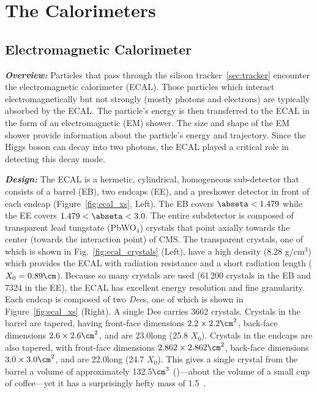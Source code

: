 \section{The Calorimeters}
\label{sec:calo}

\subsection{Electromagnetic Calorimeter}
\label{sec:ecal}

\textit{\textbf{Overview:}}
Particles that pass through the silicon tracker~\ref{sec:tracker} encounter the electromagnetic calorimeter (ECAL).
Those particles which interact electromagnetically but not strongly (\ie mostly photons and electrons) are typically absorbed by the ECAL.
The particle's energy is then transferred to the ECAL in the form of an electromagnetic (EM) shower.
The size and shape of the EM shower provide information about the particle's energy and trajectory.
Since the Higgs boson can decay into two photons, the ECAL played a critical role in detecting this decay mode.

\textit{\textbf{Design:}}
The ECAL is a hermetic, cylindrical, homogeneous sub-detector that consists of a barrel (EB), two endcaps (EE), and a preshower detector in front of each endcap (Figure~\ref{fig:ecal_xs}, Left).
The EB covers $\abseta < 1.479$ while the EE covers $1.479 < \abseta < 3.0$.
The entire subdetector is composed of transparent lead tungstate (PbWO$_4$) crystals that point axially towards the center (\ie towards the interaction point) of CMS.
The transparent crystals, one of which is shown in Fig.~\ref{fig:ecal_crystals} (Left), have a high density (8.28 g/cm$^3$) which provides the ECAL with radiation resistance and a short radiation length ($X_0 = 0.89\cm$).
Because so many crystals are used (61\,200 crystals in the EB and 7324 in the EE), the ECAL has excellent energy resolution and fine granularity.
Each endcap is composed of two \emph{Dee}s, one of which is shown in Figure~\ref{fig:ecal_xs} (Right).
A single Dee carries 3662 crystals.
Crystals in the barrel are tapered, having front-face dimensions $2.2 \times 2.2\cm^2$, back-face dimensions $2.6 \times 2.6\cm^2$, and are 23.0\cm long (25.8 $X_0$).
Crystals in the endcaps are also tapered, with front-face dimensions $2.862 \times 2.862\cm^2$, back-face dimensions $3.0 \times 3.0\cm^2$, and are 22.0\cm long (24.7 $X_0$).
This gives a single crystal from the barrel a volume of approximately 132.5$\cm^3$ (\mL)---about the volume of a small cup of coffee---yet it has a surprisingly hefty mass of 1.5\Kg~\cite{particle_data_group_review_2020}.

